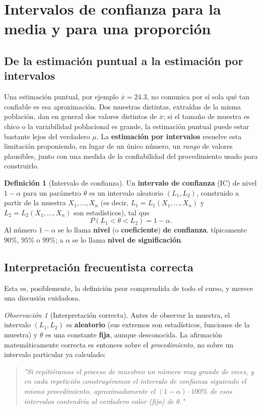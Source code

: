 \documentclass[11pt,a4paper]{article}
\theoremstyle{plain}
\theoremstyle{definition}
\newtheorem{definicion}[teorema]{Definición}
\theoremstyle{remark}
\newtheorem{observacion}[teorema]{Observación}
\begin{document}
\newpage
\section{Intervalos de confianza para la media y para una proporción}

\subsection{De la estimación puntual a la estimación por intervalos}

Una estimación puntual, por ejemplo $\overline x=24.3$, no comunica por sí sola qué tan confiable es esa aproximación. Dos muestras distintas, extraídas de la misma población, dan en general dos valores distintos de $\overline x$; si el tamaño de muestra es chico o la variabilidad poblacional es grande, la estimación puntual puede estar bastante lejos del verdadero $\mu$. La \textbf{estimación por intervalos} resuelve esta limitación proponiendo, en lugar de un único número, un \emph{rango} de valores plausibles, junto con una medida de la confiabilidad del procedimiento usado para construirlo.

\begin{definicion}[Intervalo de confianza]
Un \textbf{intervalo de confianza} (IC) de nivel $1-\alpha$ para un parámetro $\theta$ es un intervalo aleatorio $(L_1,L_2)$, construido a partir de la muestra $X_1,\dots,X_n$ (es decir, $L_1=L_1(X_1,\dots,X_n)$ y $L_2=L_2(X_1,\dots,X_n)$ son estadísticos), tal que
\[
P(L_1<\theta<L_2) = 1-\alpha.
\]
Al número $1-\alpha$ se lo llama \textbf{nivel} (o \textbf{coeficiente}) \textbf{de confianza}, típicamente $90\%$, $95\%$ o $99\%$; a $\alpha$ se lo llama \textbf{nivel de significación}.
\end{definicion}

\subsection{Interpretación frecuentista correcta}

Esta es, posiblemente, la definición peor comprendida de todo el curso, y merece una discusión cuidadosa.

\begin{observacion}[Interpretación correcta]
Antes de observar la muestra, el intervalo $(L_1,L_2)$ es \textbf{aleatorio} (sus extremos son estadísticos, funciones de la muestra) y $\theta$ es una constante \textbf{fija}, aunque desconocida. La afirmación matemáticamente correcta es entonces sobre el \emph{procedimiento}, no sobre un intervalo particular ya calculado:

\begin{quote}
\emph{"Si repitiéramos el proceso de muestreo un número muy grande de veces, y en cada repetición construyéramos el intervalo de confianza siguiendo el mismo procedimiento, aproximadamente el $(1-\alpha)\cdot 100\%$ de esos intervalos contendría al verdadero valor (fijo) de $\theta$."}
\end{quote}
\end{observacion}
\end{document}
